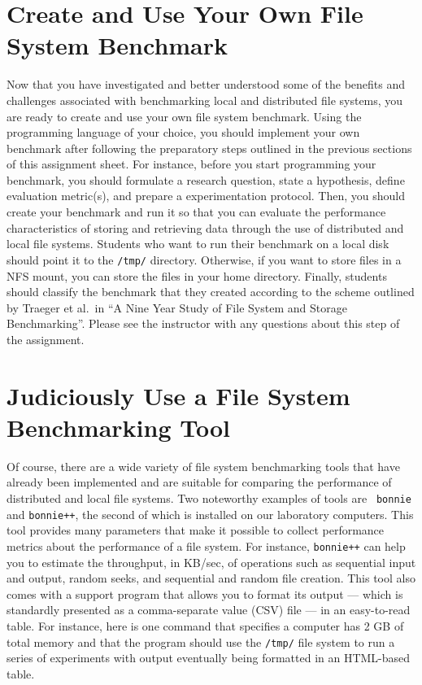 \section*{Create and Use Your Own File System Benchmark}

Now that you have investigated and better understood some of the benefits and challenges associated with benchmarking
local and distributed file systems, you are ready to create and use your own file system benchmark. Using the
programming language of your choice, you should implement your own benchmark after following the preparatory steps
outlined in the previous sections of this assignment sheet. For instance, before you start programming your benchmark,
you should formulate a research question, state a hypothesis, define evaluation metric(s), and prepare a experimentation
protocol. Then, you should create your benchmark and run it so that you can evaluate the performance characteristics of
storing and retrieving data through the use of distributed and local file systems. Students who want to run their
benchmark on a local disk should point it to the {\tt /tmp/} directory. Otherwise, if you want to store files in a NFS
mount, you can store the files in your home directory. Finally, students should classify the benchmark that they created
according to the scheme outlined by Traeger et al.\ in ``A Nine Year Study of File System and Storage Benchmarking''.
Please see the instructor with any questions about this step of the assignment.

\section*{Judiciously Use a File System Benchmarking Tool}

Of course, there are a wide variety of file system benchmarking tools that have already been implemented and are
suitable for comparing the performance of distributed and local file systems. Two noteworthy examples of tools are {\tt
bonnie} and {\tt bonnie++}, the second of which is installed on our laboratory computers. This tool provides many
parameters that make it possible to collect performance metrics about the performance of a file system. For instance,
{\tt bonnie++} can help you to estimate the throughput, in KB/sec, of operations such as sequential input and output,
random seeks, and sequential and random file creation. This tool also comes with a support program that allows you to
format its output --- which is standardly presented as a comma-separate value (CSV) file --- in an easy-to-read table.
For instance, here is one command that specifies a computer has 2 GB of total memory and that the program should use the
{\tt /tmp/} file system to run a series of experiments with output eventually being formatted in an HTML-based table.

